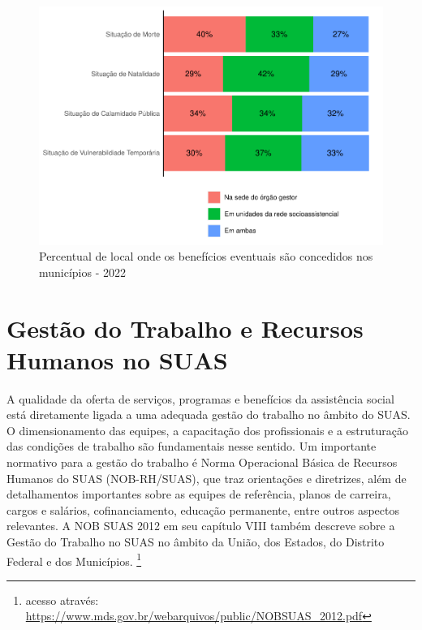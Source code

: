 \documentclass[
  brazilian]{report}
\begin{document}
\begin{figure}
\includegraphics{Censo-SUAS-2022_files/figure-latex/be-local-1} \caption[Percentual de local onde os benefícios eventuais são concedidos nos municípios - 2022]{Percentual de local onde os benefícios eventuais são concedidos nos municípios - 2022}\label{fig:be-local}
\end{figure}

\hypertarget{gestuxe3o-do-trabalho-e-recursos-humanos-no-suas}{%
\chapter{Gestão do Trabalho e Recursos Humanos no
SUAS}\label{gestuxe3o-do-trabalho-e-recursos-humanos-no-suas}}

A qualidade da oferta de serviços, programas e benefícios da assistência
social está diretamente ligada a uma adequada gestão do trabalho no
âmbito do SUAS. O dimensionamento das equipes, a capacitação dos
profissionais e a estruturação das condições de trabalho são
fundamentais nesse sentido. Um importante normativo para a gestão do
trabalho é Norma Operacional Básica de Recursos Humanos do SUAS
(NOB-RH/SUAS), que traz orientações e diretrizes, além de detalhamentos
importantes sobre as equipes de referência, planos de carreira, cargos e
salários, cofinanciamento, educação permanente, entre outros aspectos
relevantes. A NOB SUAS 2012 em seu capítulo VIII também descreve sobre a
Gestão do Trabalho no SUAS no âmbito da União, dos Estados, do Distrito
Federal e dos Municípios.
\footnote{acesso através:\url{ https://www.mds.gov.br/webarquivos/public/NOBSUAS_2012.pdf}}
\end{document}
